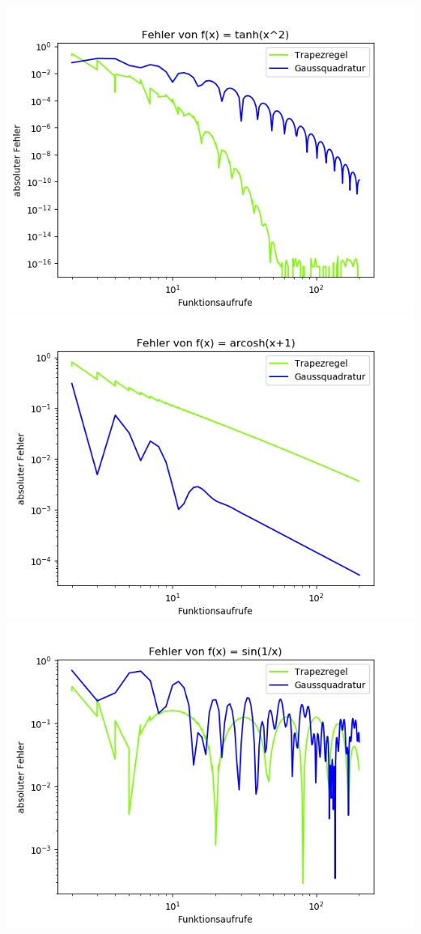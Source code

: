 \includegraphics[width=0.5\linewidth]{Aufgabe_1/gauss-trapez-tanh.png}
\includegraphics[width=0.5\linewidth]{Aufgabe_1/gauss-trapez-arcosh.png}
\includegraphics[width=0.5\linewidth]{Aufgabe_1/gauss-trapez-sin.png}